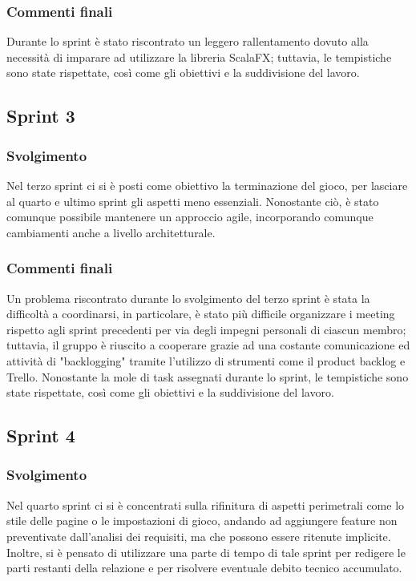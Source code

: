 \subsubsection*{Commenti finali}
Durante lo sprint è stato riscontrato un leggero rallentamento dovuto alla necessità di imparare ad utilizzare la
libreria ScalaFX; tuttavia, le tempistiche sono state rispettate, così come gli obiettivi e la suddivisione del lavoro.

\subsection{Sprint 3}
\subsubsection*{Svolgimento}
Nel terzo sprint ci si è posti come obiettivo la terminazione del gioco, per lasciare al quarto e ultimo sprint gli
aspetti meno essenziali. Nonostante ciò, è stato comunque possibile mantenere un approccio agile, incorporando comunque
cambiamenti anche a livello architetturale.
\subsubsection*{Commenti finali}
Un problema riscontrato durante lo svolgimento del terzo sprint è stata la difficoltà a coordinarsi, in particolare, è
stato più difficile organizzare i meeting rispetto agli sprint precedenti per via degli impegni personali di ciascun
membro; tuttavia, il gruppo è riuscito a cooperare grazie ad una costante comunicazione ed attività di "backlogging"
tramite l'utilizzo di strumenti come il product backlog e Trello. Nonostante la mole di task assegnati durante lo
sprint, le tempistiche sono state rispettate, così come gli obiettivi e la suddivisione del lavoro.

\subsection{Sprint 4}
\subsubsection*{Svolgimento}
Nel quarto sprint ci si è concentrati sulla rifinitura di aspetti perimetrali come lo stile delle pagine o le
impostazioni di gioco, andando ad aggiungere feature non preventivate dall'analisi dei requisiti, ma che possono essere
ritenute implicite. Inoltre, si è pensato di utilizzare una parte di tempo di tale sprint per redigere le parti
restanti della relazione e per risolvere eventuale debito tecnico accumulato.

